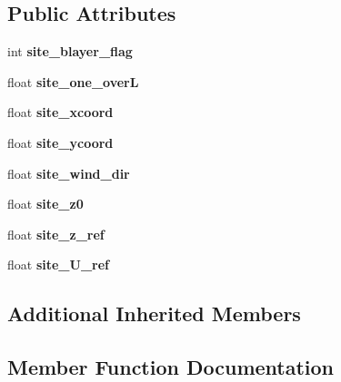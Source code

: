 \subsection*{Public Attributes}
\begin{DoxyCompactItemize}
\item 
\mbox{\label{classSensor_a828c198acfd09e73bccf793b42298f3c}} 
int {\bfseries site\+\_\+blayer\+\_\+flag}
\item 
\mbox{\label{classSensor_a7e026ca937dc83f3787d47bda5a1da88}} 
float {\bfseries site\+\_\+one\+\_\+overL}
\item 
\mbox{\label{classSensor_a9e5d9067d8fbce64ebef4b7f296e2cd2}} 
float {\bfseries site\+\_\+xcoord}
\item 
\mbox{\label{classSensor_af04a68f318fa7a67350eb16ae1ae9a20}} 
float {\bfseries site\+\_\+ycoord}
\item 
\mbox{\label{classSensor_a230269e79efba1abea972937db7e9154}} 
float {\bfseries site\+\_\+wind\+\_\+dir}
\item 
\mbox{\label{classSensor_afa438ddacfd4d2335d8cad89153da94a}} 
float {\bfseries site\+\_\+z0}
\item 
\mbox{\label{classSensor_ae620715b6b61af219845bf586d4be6ef}} 
float {\bfseries site\+\_\+z\+\_\+ref}
\item 
\mbox{\label{classSensor_a74b406df28d5e1153cc63b591e6ed8e7}} 
float {\bfseries site\+\_\+\+U\+\_\+ref}
\end{DoxyCompactItemize}
\subsection*{Additional Inherited Members}


\subsection{Member Function Documentation}
\mbox{\label{classSensor_a570a911466a9fd98894f7c2f2abaf103}} 
